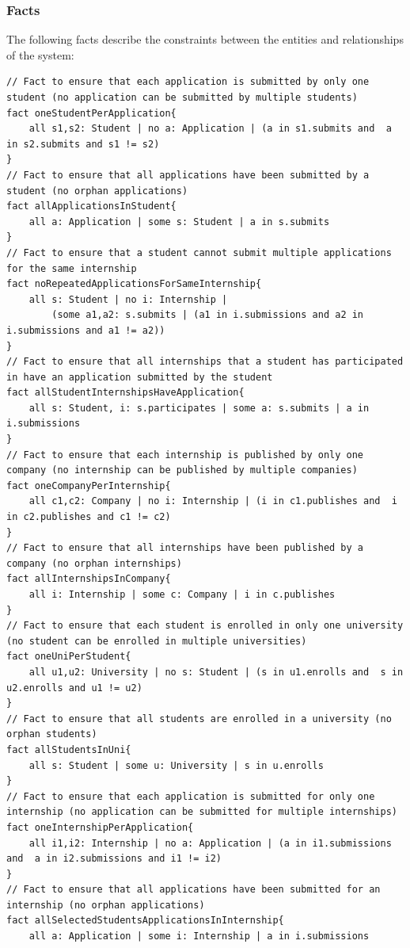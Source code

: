 \subsubsection{Facts}
The following facts describe the constraints between the entities and relationships of the system:
\begin{lstlisting}
// Fact to ensure that each application is submitted by only one student (no application can be submitted by multiple students)
fact oneStudentPerApplication{
    all s1,s2: Student | no a: Application | (a in s1.submits and  a in s2.submits and s1 != s2)
}
// Fact to ensure that all applications have been submitted by a student (no orphan applications)
fact allApplicationsInStudent{
    all a: Application | some s: Student | a in s.submits
}
// Fact to ensure that a student cannot submit multiple applications for the same internship
fact noRepeatedApplicationsForSameInternship{
    all s: Student | no i: Internship | 
        (some a1,a2: s.submits | (a1 in i.submissions and a2 in i.submissions and a1 != a2))
}
// Fact to ensure that all internships that a student has participated in have an application submitted by the student
fact allStudentInternshipsHaveApplication{
    all s: Student, i: s.participates | some a: s.submits | a in i.submissions
}
// Fact to ensure that each internship is published by only one company (no internship can be published by multiple companies)
fact oneCompanyPerInternship{
    all c1,c2: Company | no i: Internship | (i in c1.publishes and  i in c2.publishes and c1 != c2)
}
// Fact to ensure that all internships have been published by a company (no orphan internships)
fact allInternshipsInCompany{
    all i: Internship | some c: Company | i in c.publishes
}
// Fact to ensure that each student is enrolled in only one university (no student can be enrolled in multiple universities)
fact oneUniPerStudent{
    all u1,u2: University | no s: Student | (s in u1.enrolls and  s in u2.enrolls and u1 != u2)
}
// Fact to ensure that all students are enrolled in a university (no orphan students)
fact allStudentsInUni{
    all s: Student | some u: University | s in u.enrolls
}
// Fact to ensure that each application is submitted for only one internship (no application can be submitted for multiple internships)
fact oneInternshipPerApplication{
    all i1,i2: Internship | no a: Application | (a in i1.submissions and  a in i2.submissions and i1 != i2)
}
// Fact to ensure that all applications have been submitted for an internship (no orphan applications)
fact allSelectedStudentsApplicationsInInternship{
    all a: Application | some i: Internship | a in i.submissions

\end{lstlisting}
